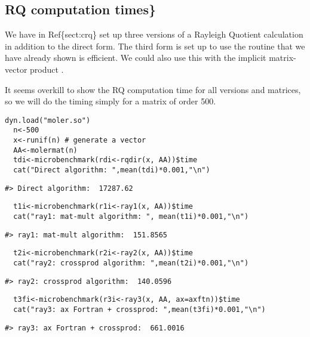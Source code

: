 \subsection{RQ computation times\}}\label{rq-computation-times}

We have in Ref\{sect:crq\} set up three versions of a Rayleigh
Quotient calculation in addition to the direct form. The third
form is set up to use the  routine that we have
already shown is efficient. We could also use this with the
implicit matrix-vector product .

It seems overkill to show the RQ computation time for all versions
and matrices, so we will do the timing simply for a matrix of
order 500.

\begin{verbatim}
dyn.load("moler.so")
  n<-500
  x<-runif(n) # generate a vector 
  AA<-molermat(n)
  tdi<-microbenchmark(rdi<-rqdir(x, AA))$time
  cat("Direct algorithm: ",mean(tdi)*0.001,"\n")
\end{verbatim}

\begin{verbatim}
#> Direct algorithm:  17287.62
\end{verbatim}

\begin{verbatim}
  t1i<-microbenchmark(r1i<-ray1(x, AA))$time
  cat("ray1: mat-mult algorithm: ", mean(t1i)*0.001,"\n")
\end{verbatim}

\begin{verbatim}
#> ray1: mat-mult algorithm:  151.8565
\end{verbatim}

\begin{verbatim}
  t2i<-microbenchmark(r2i<-ray2(x, AA))$time
  cat("ray2: crossprod algorithm: ",mean(t2i)*0.001,"\n")
\end{verbatim}

\begin{verbatim}
#> ray2: crossprod algorithm:  140.0596
\end{verbatim}

\begin{verbatim}
  t3fi<-microbenchmark(r3i<-ray3(x, AA, ax=axftn))$time
  cat("ray3: ax Fortran + crossprod: ",mean(t3fi)*0.001,"\n")
\end{verbatim}

\begin{verbatim}
#> ray3: ax Fortran + crossprod:  661.0016
\end{verbatim}

